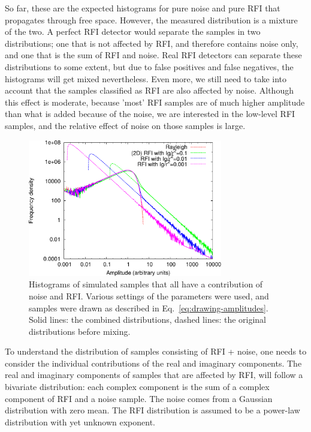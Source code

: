 \documentclass[useAMS,usenatbib]{mn2e}
\begin{document}
So far, these are the expected histograms for pure noise and pure RFI that propagates through free space. However, the measured distribution is a mixture of the two. A perfect RFI detector would separate the samples in two distributions; one that is not affected by RFI, and therefore contains noise only, and one that is the sum of RFI and noise. Real RFI detectors can separate these distributions to some extent, but due to false positives and false negatives, the histograms will get mixed nevertheless. Even more, we still need to take into account that the samples classified as RFI are also affected by noise. Although this effect is moderate, because 'most' RFI samples are of much higher amplitude than what is added because of the noise, we are interested in the low-level RFI samples, and the relative effect of noise on those samples is large.

\begin{figure}
\begin{center}\hspace{-2mm}\includegraphics[width=8.5cm]{img/plot-rayleigh-and-rfi-combined-trimmed}
\caption{Histograms of simulated samples that all have a contribution of noise and RFI. Various settings of the parameters were used, and samples were drawn as described in Eq.~\eqref{eq:drawing-amplitudes}. Solid lines: the combined distributions, dashed lines: the original distributions before mixing. }
\label{fig:rayleigh-and-rfi-combined}
\end{center}
\end{figure}

To understand the distribution of samples consisting of RFI + noise, one needs to consider the individual contributions of the real and imaginary components. The real and imaginary components of samples that are affected by RFI, will follow a bivariate distribution: each complex component is the sum of a complex component of RFI and a noise sample. The noise comes from a Gaussian distribution with zero mean. The RFI distribution is assumed to be a power-law distribution with yet unknown exponent.
\end{document}
